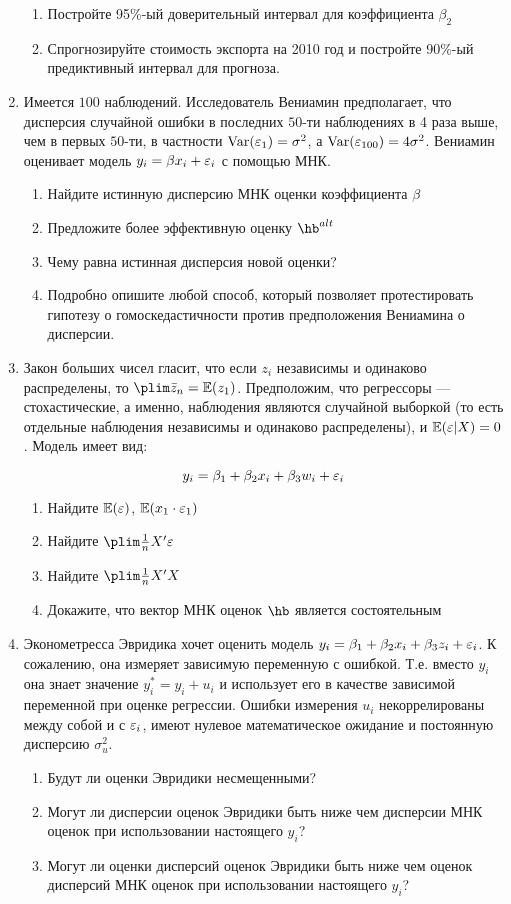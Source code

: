 \documentclass[12pt, a4paper]{article}
\theoremstyle{definition}
\begin{document}
\begin{enumerate}
\begin{enumerate}
\item Постройте 95\%-ый доверительный интервал для коэффициента $\beta_2$
\item Спрогнозируйте стоимость экспорта на 2010 год и постройте 90\%-ый предиктивный интервал для прогноза.
\end{enumerate}
\item Имеется $100$ наблюдений. Исследователь Вениамин предполагает, что дисперсия случайной ошибки в последних $50$-ти наблюдениях в 4 раза выше, чем в первых $50$-ти, в частности $\operatorname{Var}(\varepsilon_1)=\sigma^2$, а $\operatorname{Var}(\varepsilon_{100})=4\sigma^2$. Вениамин оценивает модель $y_i=\beta x_i +\varepsilon_i$ с помощью МНК.
\begin{enumerate}
\item Найдите истинную дисперсию МНК оценки коэффициента $\beta$
\item Предложите более эффективную оценку $\hb^{alt}$
\item Чему равна истинная дисперсия новой оценки?
\item Подробно опишите любой способ, который позволяет протестировать гипотезу о гомоскедастичности против предположения Вениамина о дисперсии.
\end{enumerate}

\item Закон больших чисел гласит, что если $z_i$ независимы и одинаково распределены, то $\plim \bar{z}_n = \E(z_1)$. Предположим, что регрессоры — стохастические, а именно, наблюдения являются случайной выборкой (то есть отдельные наблюдения независимы и одинаково распределены), и  $\mathbb{E}(\varepsilon | X)=0$. Модель имеет вид:

\[
y_i=\beta_1 + \beta_2 x_i +\beta_3 w_i +\varepsilon_i
\]

\begin{enumerate}
\item Найдите $\mathbb{E}(\varepsilon)$, $\mathbb{E}(x_1 \cdot \varepsilon_1)$
\item Найдите $\plim \frac{1}{n}X'\e$
\item Найдите $\plim \frac{1}{n}X'X$
\item Докажите, что вектор МНК оценок $\hb$ является состоятельным
\end{enumerate}


\item Эконометресса Эвридика хочет оценить модель $y_i=\beta_1 + \beta_2 x_i +\beta_3 z_i + \varepsilon_i$. К сожалению, она измеряет зависимую переменную с ошибкой. Т.е. вместо $y_i$ она знает значение $y_i^*=y_i+u_i$ и использует его в качестве зависимой переменной при оценке регрессии. Ошибки измерения $u_i$ некоррелированы между собой и с $\varepsilon_i$, имеют нулевое математическое ожидание и постоянную дисперсию $\sigma^2_u$.
\begin{enumerate}
\item Будут ли оценки Эвридики несмещенными?
\item Могут ли дисперсии оценок Эвридики быть ниже чем дисперсии МНК оценок при использовании настоящего $y_i$?
\item Могут ли оценки дисперсий оценок Эвридики быть ниже чем оценок дисперсий МНК оценок при использовании настоящего $y_i$?
\end{enumerate}



\end{enumerate}
\end{document}
